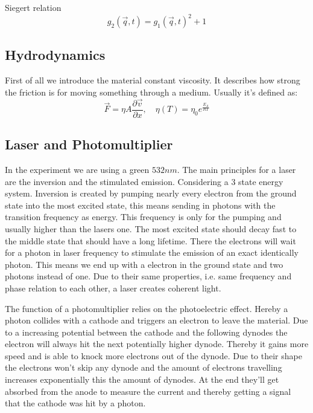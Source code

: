 \documentclass[]{article}
\begin{document}
Siegert relation
\begin{equation}\label{eq:siegert}
g_2(\vec{q},t) = g_1(\vec{q},t )^2 +1
\end{equation}


\subsection{Hydrodynamics}
\label{hyd}
First of all we introduce the material constant viscosity. It describes how strong the friction is for moving something through a medium. Usually it's defined as: 
\begin{equation}
\vec{F}=\eta A \frac{\partial \vec{v}}{\partial x} , \quad \eta(T)= \eta_0 e^{\frac{E_A}{RT}}
\end{equation}


\subsection{Laser and Photomultiplier}
In the experiment we are using a green $532nm$. The main principles for a laser are the inversion and the stimulated emission. Considering a 3 state energy system. Inversion is created by pumping nearly every electron from the ground state into the most excited state, this means sending in photons with the transition frequency as energy. This frequency is only for the pumping and usually higher than the lasers one. The most excited state should decay fast to the middle state that should have a long lifetime. There the electrons will wait for a photon in laser frequency to stimulate the emission of an exact identically photon. This means we end up with a electron in the ground state and two photons instead of one. Due to their same properties, i.e. same frequency and phase relation to each other, a laser creates coherent light.

The function of a photomultiplier relies on the photoelectric effect. Hereby a photon collides with a cathode and triggers an electron to leave the material.
Due to a increasing potential between the cathode and the following dynodes the electron will always hit the next potentially higher dynode. Thereby it gains more speed and is able to knock more electrons out of the dynode. Due to their shape the electrons won't skip any dynode and the amount of electrons travelling increases exponentially this the amount of dynodes. At the end they'll get absorbed from the anode to measure the current and thereby getting a signal that the cathode was hit by a photon.
\end{document}
